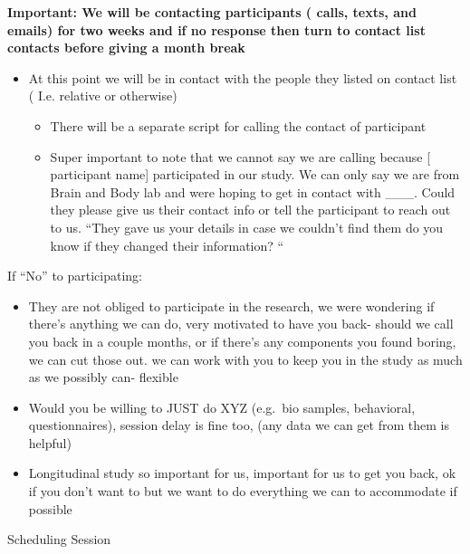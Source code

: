 \documentclass[]{book}
\providecommand{\tightlist}{%
  \setlength{\itemsep}{0pt}\setlength{\parskip}{0pt}}
\begin{document}
\textbf{Important: We will be contacting participants ( calls, texts, and emails) for two weeks and if no response then turn to contact list contacts before giving a month break}

\begin{itemize}
\tightlist
\item
  At this point we will be in contact with the people they listed on contact list ( I.e. relative or otherwise)

  \begin{itemize}
  \tightlist
  \item
    There will be a separate script for calling the contact of participant
  \item
    Super important to note that we cannot say we are calling because {[} participant name{]} participated in our study. We can only say we are from Brain and Body lab and were hoping to get in contact with \_\_\_. Could they please give us their contact info or tell the participant to reach out to us. ``They gave us your details in case we couldn't find them do you know if they changed their information? ``
  \end{itemize}
\end{itemize}

If ``No'' to participating:

\begin{itemize}
\tightlist
\item
  They are not obliged to participate in the research, we were wondering if there's anything we can do, very motivated to have you back- should we call you back in a couple months, or if there's any components you found boring, we can cut those out. we can work with you to keep you in the study as much as we possibly can- flexible\\
\item
  Would you be willing to JUST do XYZ (e.g.~bio samples, behavioral, questionnaires), session delay is fine too, (any data we can get from them is helpful)
\item
  Longitudinal study so important for us, important for us to get you back, ok if you don't want to but we want to do everything we can to accommodate if possible
\end{itemize}

Scheduling Session
\end{document}
